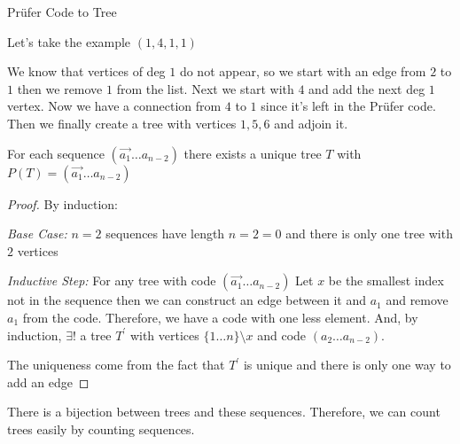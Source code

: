 
Prüfer Code to Tree 

\begin{example}
    \label{ex:prufer code to tree}
    Let's take the example \((1,4,1,1)\)

    We know that vertices of deg \(1\) do not appear, so we start with an edge from \(2\) to \(1\)  then we remove \(1\) from the list. Next we start with \(4\) and add the next deg \(1\) vertex. Now we have a connection from \(4\) to \(1\) since it's left in the Prüfer code. Then we finally create a tree with vertices \(1,5,6\) and adjoin it.
\end{example} 

\begin{theorem}[1]
    \label{thm:1}
    For each sequence \((\vec{a_1} \ldots a_{n-2})\) there exists a unique tree \(T\) with \(P(T) = (\vec{a_1} \ldots a_{n-2})\)
\end{theorem}
\begin{proof}
    By induction:
    
    \emph{Base Case:} \(n = 2\)
    sequences have length \(n = 2 = 0\) and there is only one tree with \(2\) vertices

    \emph{Inductive Step:}
    For any tree with code \((\vec{a_1} \ldots a_{n-2})\) Let \(x\) be the smallest index not in the sequence then we can construct an edge between it and \(a_1\) and remove \(a_1\) from the code. Therefore, we have a code with one less element. And, by induction, \(\exists !\) a tree \(T^\prime\) with vertices \(\{1\ldots n\}\setminus{x}\)  and code \((a_2 \ldots a_{n-2})\).

    The uniqueness come from the fact that \(T^\prime\) is unique and there is only one way to add an edge
\end{proof}
\begin{corollary}[cayley]
    \label{cor:cayley}
    There is a bijection between trees and these sequences. Therefore, we can count trees easily by counting sequences.
\end{corollary}



